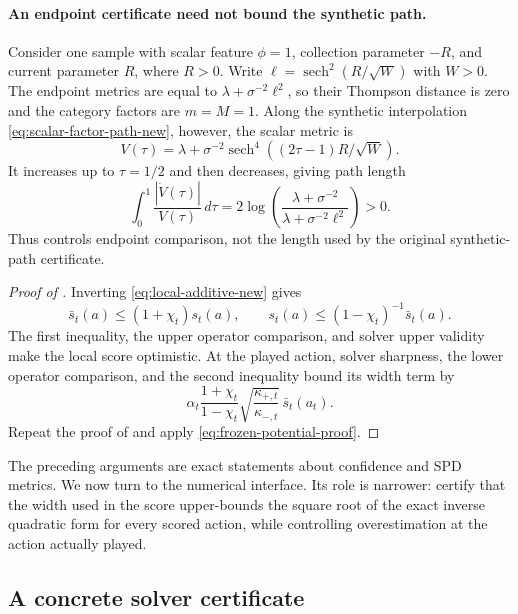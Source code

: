 \paragraph{An endpoint certificate need not bound the synthetic path.}
Consider one sample with scalar feature $\phi=1$, collection parameter $-R$,
and current parameter $R$, where $R>0$.  Write
$\ell=\operatorname{sech}^2(R/\sqrt W)$ with $W>0$.  The endpoint metrics are
equal to $\lambda+\sigma^{-2}\ell^2$, so their Thompson distance is zero and
the category factors are $m=M=1$.  Along the synthetic interpolation
\eqref{eq:scalar-factor-path-new}, however, the scalar metric is
\[
 V(\tau)=\lambda+\sigma^{-2}
 \operatorname{sech}^4((2\tau-1)R/\sqrt W).
\]
It increases up to $\tau=1/2$ and then decreases, giving path length
\[
 \int_0^1\frac{|\dot V(\tau)|}{V(\tau)}\,d\tau
 =2\log\!\left(\frac{\lambda+\sigma^{-2}}
 {\lambda+\sigma^{-2}\ell^2}\right)>0.
\]
Thus  controls endpoint comparison, not the
length used by the original synthetic-path certificate.

\begin{proof}[Proof of ]
Inverting \eqref{eq:local-additive-new} gives
\[
 \bar s_t(a)\le(1+\chi_t)s_t(a),\qquad
 s_t(a)\le(1-\chi_t)^{-1}\bar s_t(a).
\]
The first inequality, the upper operator comparison, and solver upper validity
make the local score optimistic.  At the played action, solver sharpness, the
lower operator comparison, and the second inequality bound its width term by
\[
 \alpha_t\frac{1+\chi_t}{1-\chi_t}
 \sqrt{\frac{\kappa_{+,t}}{\kappa_{-,t}}}\,\bar s_t(a_t).
\]
Repeat the proof of  and apply
\eqref{eq:frozen-potential-proof}.
\end{proof}

The preceding arguments are exact statements about confidence and SPD metrics.
We now turn to the numerical interface.  Its role is narrower: certify that the
width used in the score upper-bounds the square root of the exact inverse
quadratic form for every scored action, while controlling overestimation at the
action actually played.

\subsection{A concrete solver certificate}

